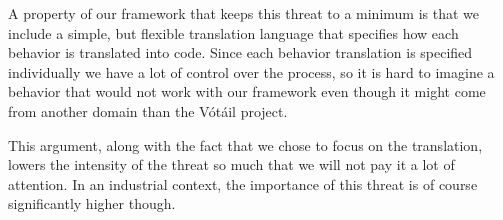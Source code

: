 A property of our framework that keeps this threat to a minimum is that we include a simple, but flexible translation language that specifies how each behavior is translated into code.
Since each behavior translation is specified individually we have a lot of control over the process, so it is hard to imagine a behavior that would not work with our framework even though it might come from another domain than the V\'{o}t\'{a}il project.
 
This argument, along with the fact that we chose to focus on the translation, lowers the intensity of the threat so much that we will not pay it a lot of attention.
In an industrial context, the importance of this threat is of course significantly higher though.

